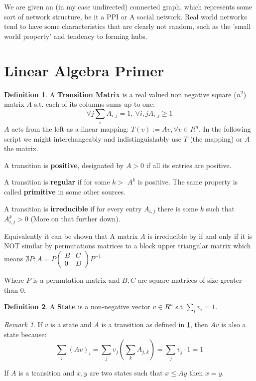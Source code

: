 \documentclass[a4paper,10pt]{article}
\theoremstyle{definition}
\newtheorem{mydef}{Definition}[section]
\theoremstyle{remark}
\newtheorem{remark}{Remark}
\theoremstyle{plain}
\begin{document}
We are given an (in my case undirected) connected graph, which represents some sort of
network structure, be it a PPI or A social network. Real world networks tend to
have some characteristics that are clearly not random, such as the 'small world
property' and tendency to forming hubs. 

\section{Linear Algebra Primer}

\begin{mydef}
\label{def:transition}
A \textbf{Transition Matrix} is a real valued non negative square ($n^2$) matrix $A$ s.t. each of its
columns sums up to one: $$\forall j \sum_i A_{i,j} = 1,\ \forall i,j A_{i,j} \geq
1$$ 
$A$ acts from the left as a linear mapping:
$T(v) := Av, \forall v \in R^{n}$. In the following script we might
interchangeably and indistinguishably use $T$ (the mapping) or $A$ the matrix.

A transition is \textbf{positive}, designated by $A > 0$ if all its entries are positive.

A transition is \textbf{regular} if for some $k>$ $A^k$ is positive. The same
property is called \textbf{primitive} in some other sources.

A transition is \textbf{irreducible} if for every entry $A_{i,j}$ there is some $k$ such
that $A^k_{i,j} > 0$ (More on that further down).

Equivalently it can be shown that 
A matrix $A$ is 
irreducible by if and only if it is NOT
similar by permutations matrices to a block upper triangular matrix
which means 
$
\nexists P : 
A =
P
\begin{pmatrix}
B & C \\
0 & D
\end{pmatrix}
P^{-1}
$

Where $P$ is a permutation matrix and $B, C$ are square matrices of size greater than $0$.
\end{mydef}

\begin{mydef}
\label{def:state}
A \textbf{State} is a non-negative vector $v \in R^n$ s.t $\sum_i v_i = 1$.
\end{mydef}

\begin{remark}
\label{remark:state}
If $v$ is a
state and $A$ is a transition as defined in
\ref{def:transition}, then
  $Av$ is also a state because: 
$$\sum_i(Av)_i = \sum_j v_j(\sum_k A_{j,k}) = \sum_j v_j \cdot 1 = 1$$

If $A$ is a transition and $x,y$ are two states such that
$x \leq Ay$ then $x=y$.
\end{remark}
\end{document}
